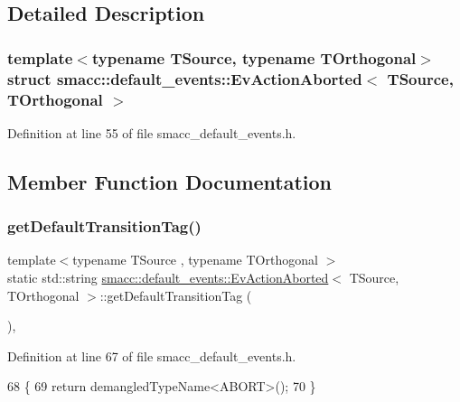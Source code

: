 \subsection{Detailed Description}
\subsubsection*{template$<$typename T\+Source, typename T\+Orthogonal$>$\newline
struct smacc\+::default\+\_\+events\+::\+Ev\+Action\+Aborted$<$ T\+Source, T\+Orthogonal $>$}



Definition at line 55 of file smacc\+\_\+default\+\_\+events.\+h.



\subsection{Member Function Documentation}
\mbox{\label{structsmacc_1_1default__events_1_1EvActionAborted_a989f288bf3ad9a7ea6acbef46bb77444}} 
\subsubsection{\texorpdfstring{get\+Default\+Transition\+Tag()}{getDefaultTransitionTag()}}
{\footnotesize\ttfamily template$<$typename T\+Source , typename T\+Orthogonal $>$ \\
static std\+::string \hyperlink{structsmacc_1_1default__events_1_1EvActionAborted}{smacc\+::default\+\_\+events\+::\+Ev\+Action\+Aborted}$<$ T\+Source, T\+Orthogonal $>$\+::get\+Default\+Transition\+Tag (\begin{DoxyParamCaption}{ }\end{DoxyParamCaption})\hspace{0.3cm}{\ttfamily [inline]}, {\ttfamily [static]}}



Definition at line 67 of file smacc\+\_\+default\+\_\+events.\+h.


\begin{DoxyCode}
68   \{
69     \textcolor{keywordflow}{return} demangledTypeName<ABORT>();
70   \}
\end{DoxyCode}
\mbox{\label{structsmacc_1_1default__events_1_1EvActionAborted_a6ad077f5908f46974c09a53cd27ef48e}} 
